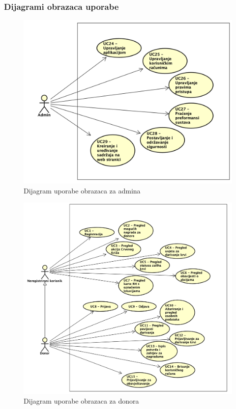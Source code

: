				\subsubsection{Dijagrami obrazaca uporabe}
					
					\begin{figure}[H]
						\includegraphics[scale=0.4]{slike/Dijagrami/DOU_admin.PNG} %
						\centering
						\caption{Dijagram uporabe obrazaca za admina}
						\label{fig:promjene}
					\end{figure}
					\begin{figure}[H]
						\includegraphics[scale=0.4]{slike/Dijagrami/DOU_donor.PNG} %
						\centering
						\caption{Dijagram uporabe obrazaca za donora}
						\label{fig:promjene}
					\end{figure}
